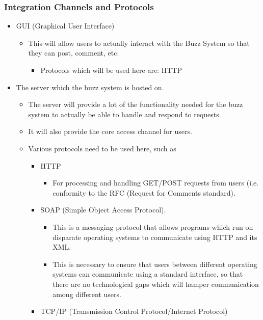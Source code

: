\documentclass[11pt]{article}
\begin{document}
	\subsubsection{Integration Channels and Protocols}
	\begin{itemize}
	\item GUI (Graphical User Interface)
		\begin{itemize}
			\item This will allow users to actually interact with the Buzz System so that they can post, comment, etc. 
			\begin{itemize}
				\item Protocols which will be used here are: HTTP
			\end{itemize}
		\end{itemize}
	\item The server which the buzz system is hosted on.
		\begin{itemize}
			\item The server will provide a lot of the functionality needed for the buzz system to actually be able to handle and respond to requests.
			\item It will also provide the core access channel for users. 
			\item Various protocols need to be used here, such as
				\begin{itemize}
					\item HTTP
						\begin{itemize}
							\item For processing and handling GET/POST requests from users (i.e. conformity to the RFC (Request for Comments standard).
						\end{itemize}
					\item SOAP (Simple Object Access Protocol). 
						\begin{itemize}
							\item This is a messaging protocol that allows programs which run on disparate operating systems to communicate using HTTP and its XML. 
							\item This is necessary to ensure that users between different operating systems can communicate using a standard interface, so that there are no technological gaps which will hamper communication among different users.
						\end{itemize}
					\item TCP/IP (Transmission Control Protocol/Internet Protocol)
						\begin{itemize}

\end{itemize}
\end{itemize}
\end{itemize}
\end{itemize}
\end{document}
